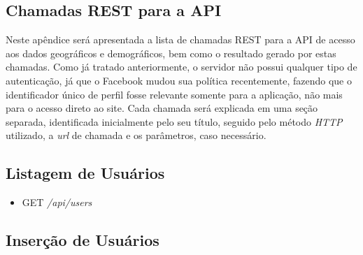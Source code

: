 \documentclass[
	12pt,				%
	oneside,			%
	a4paper,			%
	english,			%
	brazil				%
	]{abntex2ppgsi}
\begin{document}
\begin{apendicesenv}


%
%
%
\chapter{Chamadas REST para a API}
\label{apendiceA}

Neste apêndice será apresentada a lista de chamadas REST para a API de acesso aos dados geográficos e demográficos, bem como o resultado gerado por estas chamadas. Como já tratado anteriormente, o servidor não possui qualquer tipo de autenticação, já que o Facebook mudou sua política recentemente, fazendo que o identificador único de perfil fosse relevante somente para a aplicação, não mais para o acesso direto ao site. Cada chamada será explicada em uma seção separada, identificada inicialmente pelo seu título, seguido pelo método \textit{HTTP} utilizado, a \textit{url} de chamada e os parâmetros, caso necessário.

\section{Listagem de Usuários}

\begin{itemize}
	\item {GET} \textit{/api/users}
\end{itemize}

\section{Inserção de Usuários}


\end{apendicesenv}
\end{document}
